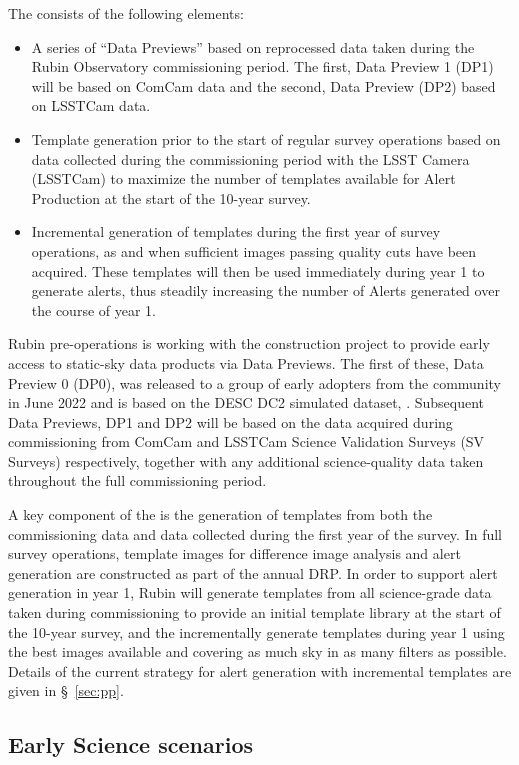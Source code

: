 The \esp consists of the following elements:
\begin{itemize}
	\item A series of ``Data Previews'' based on reprocessed data taken during the Rubin Observatory commissioning period. The first, Data Preview 1 (DP1) will be based on ComCam data and the second, Data Preview (DP2) based on LSSTCam data. 
	\item Template generation prior to the start of regular survey operations based on data collected during the commissioning period with the LSST Camera (LSSTCam) to maximize the number of templates available for Alert Production at the start of the 10-year survey.
	\item Incremental generation of templates during the first year of survey operations, as and when sufficient images passing quality cuts have been acquired. These templates will then be used immediately during year 1 to generate alerts, thus steadily increasing the number of Alerts generated over the course of year 1. 
\end{itemize}

Rubin pre-operations is working with the construction project to provide early access to static-sky data products via Data Previews. 
The first of these, Data Preview 0 (DP0), was released to a group of early adopters from the community in June 2022 and is based on the DESC DC2 simulated dataset, \citep{2021ApJS..253...31L}. 
Subsequent Data Previews, DP1 and DP2 will be based on the data acquired during  commissioning from ComCam and LSSTCam Science Validation Surveys (SV Surveys) respectively, together with any additional science-quality data taken throughout the full commissioning period.

A key component of the \esp is the generation of templates from both the commissioning data and data collected during the first year of the survey.
In full survey operations, template images for difference image analysis and alert generation are constructed as part of the annual DRP.
In order to support alert generation in year 1, Rubin will generate templates from all science-grade data taken during commissioning to provide an initial template library at the start of the 10-year survey, and the incrementally generate templates during year 1 using the best images available and covering as much sky in as many filters as possible.
Details of the current strategy for alert generation  with incremental templates are given in  \S~\ref{sec:pp}.


\subsection{Early Science scenarios } \label{ssec:scenarios}

